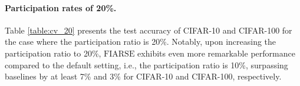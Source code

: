 \documentclass{article}
\theoremstyle{plain}
\theoremstyle{definition}
\theoremstyle{remark}
\newcommand{\algo}{\ensuremath{\text{FIARSE}}\xspace}
\begin{document}
\paragraph{Participation rates of 20\%.} 


Table \ref{table:cv_20} presents the test accuracy of CIFAR-10 and CIFAR-100 for the case where the participation ratio is 20\%. Notably, upon increasing the participation ratio to 20\%, \algo exhibits even more remarkable performance compared to the default setting, i.e., the participation ratio is 10\%, surpassing baselines by at least 7\% and 3\% for CIFAR-10 and CIFAR-100, respectively. 





\begin{table}[h]
\centering
\renewcommand{\arraystretch}{1.3}
\caption{Test accuracy under five different submodel sizes on different datasets. To be more specific, the columns from ``Local'' to ``Model (1.0)'' evaluate the test accuracy on the local test datasets, while ``Global'' evaluates the average test accuracy of the global model of five different sizes (0.04, 0.16, 0.36, 0.64, 1.0) on the global test dataset.}
\end{table}
\end{document}
